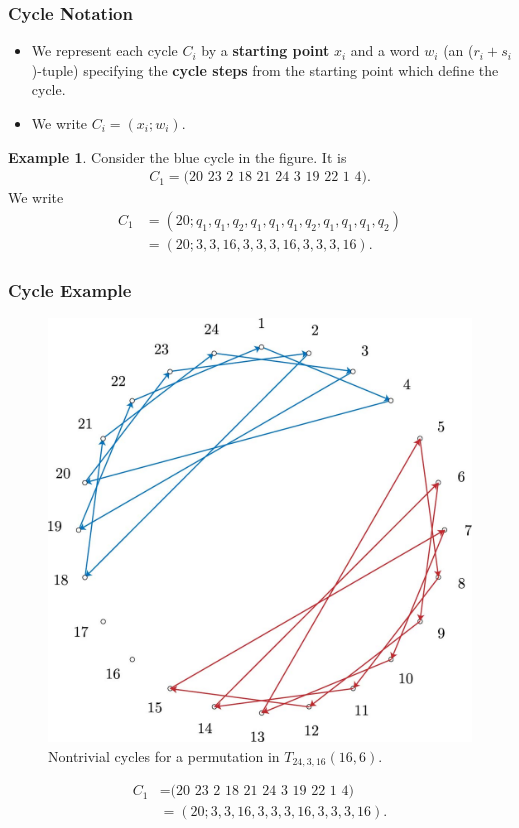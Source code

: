 \documentclass{beamer}
\theoremstyle{plain}
\theoremstyle{definition}
\newtheorem{Ex}[theorem]{Example}
\theoremstyle{remark}
\newcommand{\bee}{\begin{equation}\begin{aligned}}
\newcommand{\eee}{\end{aligned}\end{equation}}
\renewcommand{\'}{\hspace{0.5mm}'}		%
\begin{document}

\begin{frame}
\frametitle{Cycle Notation}

	\begin{itemize}
		\item We represent each cycle $C_i$ by a 
		\textbf{starting point} $x_i$
		and a word $w_i$ (an ($r_i + s_i$)-tuple)
		specifying the \textbf{cycle steps} 
		from the starting point
		which define the cycle. 
		\item We write $C_i = (x_i;w_i)$. 
	\end{itemize}
	
	\begin{Ex}
		Consider the blue cycle in the figure. It is
		\bee
			C_1 = \text{(20 23 2 18 21 24 3 19 22 1 4)}. 
		\eee
		We write
		\bee
			C_1 &= (20; 
			q_1,q_1,q_2,q_1,q_1,q_1,q_2,q_1,q_1,q_1,q_2)\\
			&= (20; 3,3,16,3,3,3,16,3,3,3,16). 
		\eee
	\end{Ex}


\end{frame}


\begin{frame}
\frametitle{Cycle Example}

	\begin{figure}
		\includegraphics[scale=0.1]{circ_24_3_16_16_6.jpg}
		\caption{Nontrivial cycles for a permutation in
		$T_{24,3,16}(16,6)$. }
	\end{figure}
	\bee
		C_1 &= \text{(20 23 2 18 21 24 3 19 22 1 4)} \\
		&= (20; 3,3,16,3,3,3,16,3,3,3,16). 
	\eee

\end{frame}
\end{document}
